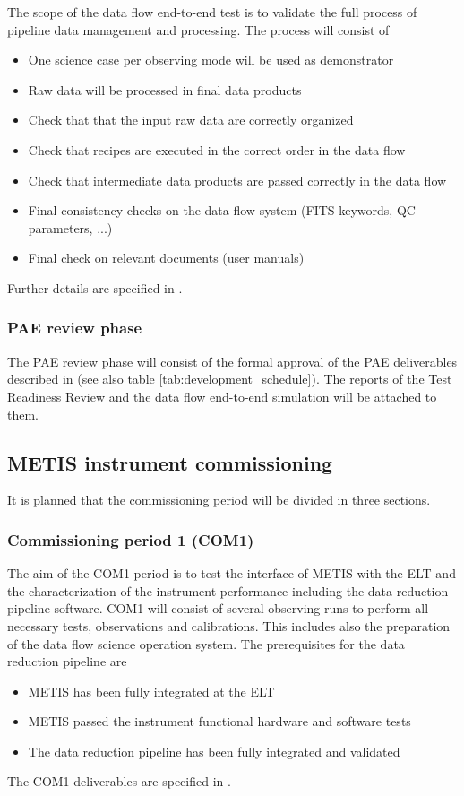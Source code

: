 The scope of the data flow end-to-end test is to validate the full process of pipeline data management and processing. The process will consist of
\begin{itemize}
    \item One science case per observing mode will be used as demonstrator
    \item Raw data will be processed in final data products
    \item Check that that the input raw data are correctly organized
    \item Check that recipes are executed in the correct order in the data flow
    \item Check that intermediate data products are passed correctly in the data flow
    \item Final consistency checks on the data flow system (FITS keywords, QC parameters, ...)
    \item Final check on relevant documents (user manuals)
\end{itemize}
Further details are specified in \cite{DRLVT}.

\subsubsection{PAE review phase}
\label{sssec:paw_review}

The PAE review phase will consist of the formal approval of the PAE deliverables described in \cite{1618} (see also table \ref{tab:development_schedule}). The reports of the Test Readiness Review and the data flow end-to-end simulation will be attached to them. 

\subsection{METIS instrument commissioning}
\label{ssec:com}

It is planned that the commissioning period will be divided in three sections.

\subsubsection{Commissioning period 1 (COM1)}
\label{ssec:com1}

The aim of the COM1 period is to test the interface of METIS with the ELT and the characterization of the instrument performance including the data reduction pipeline software. COM1 will consist of several observing runs to perform all necessary tests, observations and calibrations. This includes also the preparation of the data flow science operation system. The prerequisites for the data reduction pipeline are
\begin{itemize}
    \item METIS has been fully integrated at the ELT
    \item METIS passed the instrument functional hardware and software tests
    \item The data reduction pipeline  has been fully integrated and validated
\end{itemize}
The COM1 deliverables are specified in \cite{1618}.

